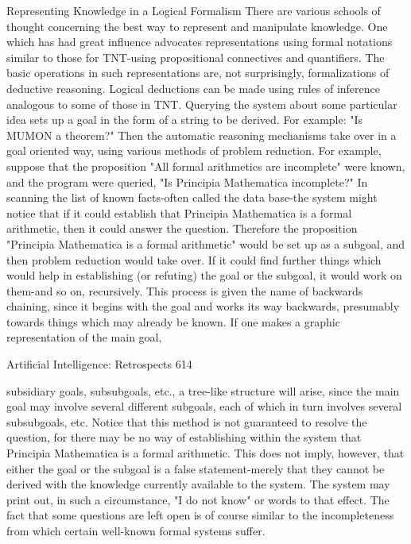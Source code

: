 {               Representing Knowledge in a Logical Formalism
There are various schools of thought concerning the best way to represent and manipulate
knowledge. One which has had great influence advocates representations using formal
notations similar to those for TNT-using propositional connectives and quantifiers. The
basic operations in such representations are, not surprisingly, formalizations of deductive
reasoning. Logical deductions can be made using rules of inference analogous to some of
those in TNT. Querying the system about some particular idea sets up a goal in the form
of a string to be derived. For example: "Is MUMON a theorem?" Then the automatic
reasoning mechanisms take over in a goal oriented way, using various methods of
problem reduction.
        For example, suppose that the proposition "All formal arithmetics are incomplete"
were known, and the program were queried, "Is Principia Mathematica incomplete?" In
scanning the list of known facts-often called the data base-the system might notice that if
it could establish that Principia Mathematica is a formal arithmetic, then it could answer
the question. Therefore the proposition "Principia Mathematica is a formal arithmetic"
would be set up as a subgoal, and then problem reduction would take over. If it could find
further things which would help in establishing (or refuting) the goal or the subgoal, it
would work on them-and so on, recursively. This process is given the name of backwards
chaining, since it begins with the goal and works its way backwards, presumably towards
things which may already be known. If one makes a graphic representation of the main
goal,




Artificial Intelligence: Retrospects                                                   614

subsidiary goals, subsubgoals, etc., a tree-like structure will arise, since the main goal
may involve several different subgoals, each of which in turn involves several
subsubgoals, etc.
        Notice that this method is not guaranteed to resolve the question, for there may be
no way of establishing within the system that Principia Mathematica is a formal
arithmetic. This does not imply, however, that either the goal or the subgoal is a false
statement-merely that they cannot be derived with the knowledge currently available to
the system. The system may print out, in such a circumstance, "I do not know" or words
to that effect. The fact that some questions are left open is of course similar to the
incompleteness from which certain well-known formal systems suffer.

}
